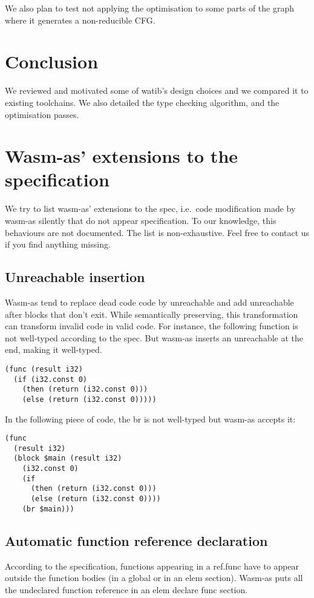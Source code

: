\documentclass[a4paper,11pt]{article}
\renewcommand{\baselinestretch}{1.05}
\begin{document}
We also plan to test not applying the optimisation to some parts of the graph
where it generates a non-reducible CFG.

\section{Conclusion}
We reviewed and motivated some of \textsf{watib}'s design choices and we
compared it to existing toolchains. We also detailed the type checking
algorithm, and the optimisation passes.


\renewcommand{\baselinestretch}{1}
\printbibliography
\renewcommand{\baselinestretch}{1.05}

\newpage
\appendix
\section{Wasm-as' extensions to the specification}\label{wasmasex}
We try to list wasm-as' extensions to the spec, i.e.\ code modification made by
wasm-as silently that do not appear specification. To our knowledge, this
behaviours are not documented. The list is non-exhaustive. Feel free to contact
us if you find anything missing.
\subsection{\textsf{Unreachable} insertion}
Wasm-as tend to replace dead code code by \textsf{unreachable} and add
\textsf{unreachable} after blocks that don't exit. While semantically
preserving, this transformation can transform invalid code in valid code. For
instance, the following function is not well-typed according to the spec. But
wasm-as inserts an \textsf{unreachable} at the end, making it well-typed.
\begin{lstlisting}
(func (result i32)
  (if (i32.const 0)
    (then (return (i32.const 0)))
    (else (return (i32.const 0)))))
\end{lstlisting}

In the following piece of code, the \textsf{br} is not well-typed but wasm-as accepts
it:
\begin{lstlisting}
(func
  (result i32)
  (block $main (result i32)
    (i32.const 0)
    (if
      (then (return (i32.const 0)))
      (else (return (i32.const 0))))
    (br $main)))
\end{lstlisting}
\subsection{Automatic function reference declaration}
According to the specification, functions appearing in a \textsf{ref.func} have to
appear outside the function bodies (in a global or in an elem section). Wasm-as
puts all the undeclared function reference in an \textsf{elem declare func} section.
\end{document}
